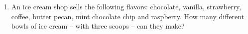 \begin{enumerate}
\item An ice cream shop sells the following flavors: chocolate, vanilla, 
strawberry, coffee, butter pecan, mint chocolate chip and raspberry.
How many different bowls of ice cream -- with three scoops -- can they make?  

\wbvfill


\end{enumerate}
